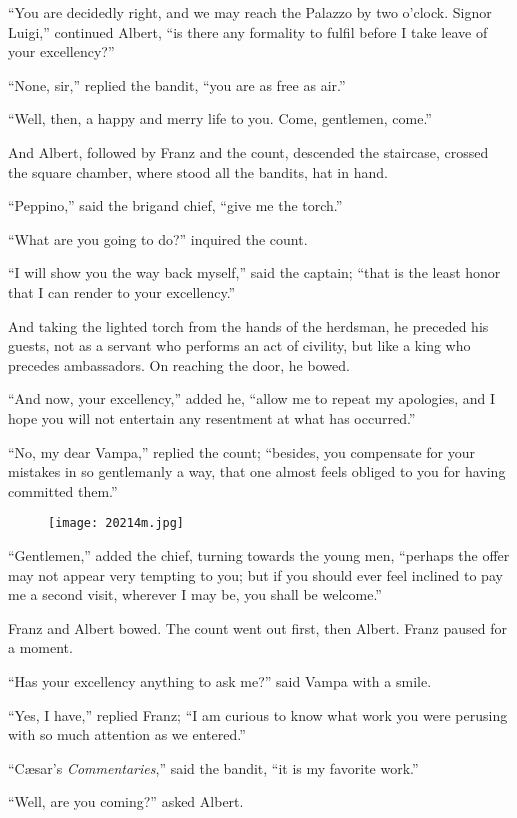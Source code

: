 “You are decidedly right, and we may reach the Palazzo by two o’clock.
Signor Luigi,” continued Albert, “is there any formality to fulfil
before I take leave of your excellency?”

“None, sir,” replied the bandit, “you are as free as air.”

“Well, then, a happy and merry life to you. Come, gentlemen, come.”

And Albert, followed by Franz and the count, descended the staircase,
crossed the square chamber, where stood all the bandits, hat in hand.

“Peppino,” said the brigand chief, “give me the torch.”

“What are you going to do?” inquired the count.

“I will show you the way back myself,” said the captain; “that is the
least honor that I can render to your excellency.”

And taking the lighted torch from the hands of the herdsman, he
preceded his guests, not as a servant who performs an act of civility,
but like a king who precedes ambassadors. On reaching the door, he
bowed.

“And now, your excellency,” added he, “allow me to repeat my apologies,
and I hope you will not entertain any resentment at what has occurred.”

“No, my dear Vampa,” replied the count; “besides, you compensate for
your mistakes in so gentlemanly a way, that one almost feels obliged to
you for having committed them.”

\begin{figure}[ht]
\texttt{[image: 20214m.jpg]}
\end{figure}

“Gentlemen,” added the chief, turning towards the young men, “perhaps
the offer may not appear very tempting to you; but if you should ever
feel inclined to pay me a second visit, wherever I may be, you shall be
welcome.”

Franz and Albert bowed. The count went out first, then Albert. Franz
paused for a moment.

“Has your excellency anything to ask me?” said Vampa with a smile.

“Yes, I have,” replied Franz; “I am curious to know what work you were
perusing with so much attention as we entered.”

“Cæsar’s \textit{Commentaries},” said the bandit, “it is my favorite work.”

“Well, are you coming?” asked Albert.

